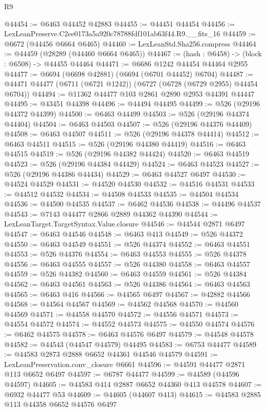 \begin{lexlean}{R9}
\begin{coremodule}
@44454 := @6463 @44452 @42883
@44455 := @44451 @44454
@44456 := LexLeanPreserve.C2ee0173a5a920c78788fdf101ab63f44.R9.__fits_16
@44459 := @6672 (@44456 @6664 @6465)
@44460 := LexLeanStd.Sha256.compress
@44464 := @44459 (@28289 (@44460 @6664 @6465))
@44467 := (hash : @6458) -> (block : @6508) -> @44455 @44464
@44471 := @6686 @1242 @44454 @44464 @2955
@44477 := @6694 (@6698 @42881) (@6694 (@6701 @44452) @6704)
@44487 := @44471 @44477 (@6711 (@6721 @1242)) (@6727 (@6728 (@6729 @2955) @44454 @6704))
@44494 := @11362 @44477 @103 @2861 @2890 @2953 @44391 @44447
@44495 := @43451 @44398
@44496 := @44494 @44495
@44499 := @526 (@29196 @44372 @44399)
@44500 := @6463 @44499
@44503 := @526 (@29196 @44374 @44404)
@44504 := @6463 @44503
@44507 := @526 (@29196 @44376 @44409)
@44508 := @6463 @44507
@44511 := @526 (@29196 @44378 @44414)
@44512 := @6463 @44511
@44515 := @526 (@29196 @44380 @44419)
@44516 := @6463 @44515
@44519 := @526 (@29196 @44382 @44424)
@44520 := @6463 @44519
@44523 := @526 (@29196 @44384 @44429)
@44524 := @6463 @44523
@44527 := @526 (@29196 @44386 @44434)
@44529 := @6463 @44527 @6497
@44530 := @44524 @44529
@44531 := @44520 @44530
@44532 := @44516 @44531
@44533 := @44512 @44532
@44534 := @44508 @44533
@44535 := @44504 @44534
@44536 := @44500 @44535
@44537 := @6462 @44536
@44538 := @44496 @44537
@44543 := @7143 @44477 @2866 @2889 @44362 @44390
@44544 := LexLeanTarget.TargetSyntax.Value.closure
@44546 := @44544 @2871 @6497
@44547 := @6463 @44546
@44548 := @6463 @413
@44549 := @526 @44372
@44550 := @6463 @44549
@44551 := @526 @44374
@44552 := @6463 @44551
@44553 := @526 @44376
@44554 := @6463 @44553
@44555 := @526 @44378
@44556 := @6463 @44555
@44557 := @526 @44380
@44558 := @6463 @44557
@44559 := @526 @44382
@44560 := @6463 @44559
@44561 := @526 @44384
@44562 := @6463 @44561
@44563 := @526 @44386
@44564 := @6463 @44563
@44565 := @6463 @416
@44566 := @44565 @6497
@44567 := @42882 @44566
@44568 := @44564 @44567
@44569 := @44562 @44568
@44570 := @44560 @44569
@44571 := @44558 @44570
@44572 := @44556 @44571
@44573 := @44554 @44572
@44574 := @44552 @44573
@44575 := @44550 @44574
@44576 := @6462 @44575
@44578 := @6463 @44576 @6497
@44579 := @44548 @44578
@44582 := @44543 (@44547 @44579) @44495
@44583 := @6753 @44477
@44589 := @44583 @2873 @2888 @6652 @44361 @44546 @44579
@44591 := LexLeanPreservation.conv_closure @6661
@44596 := @44591 @44477 @2871 @113 @6652 @6497
@44597 := @6787 @44477
@44599 := @44589 (@44596 @44597)
@44605 := @44583 @414 @2887 @6652 @44360 @413 @44578
@44607 := @6932 @44477 @53
@44609 := @44605 (@44607 @413)
@44615 := @44583 @2885 @113 @44358 @6652 @44576 @6497

\end{coremodule}
\end{lexlean}
